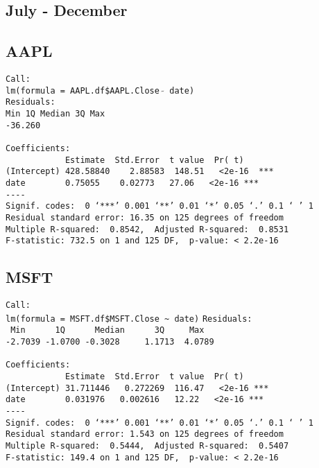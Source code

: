 \documentclass{article}[14pt]
\begin{document}
\subsection{July - December}
\subsection{AAPL}
\texttt{Call: \\
lm(formula = AAPL.df\$AAPL.Close $\tilde{}$ date)\\
Residuals:\\
Min \hspace{35pt} 1Q \qquad Median \qquad 3Q \qquad  Max\\
-36.260        \\}
\verb| |\\
\verb|Coefficients:|\\
\verb|            Estimate  Std.Error  t value  Pr( t)|\\
\verb|(Intercept) 428.58840    2.88583  148.51   <2e-16  ***|\\
\verb|date        0.75055    0.02773   27.06   <2e-16 ***|\\
\verb|----|\\
\verb|Signif. codes:  0 ‘***’ 0.001 ‘**’ 0.01 ‘*’ 0.05 ‘.’ 0.1 ‘ ’ 1|\\
\verb|Residual standard error: 16.35 on 125 degrees of freedom|\\
\verb|Multiple R-squared:  0.8542,	Adjusted R-squared:  0.8531|\\
\verb|F-statistic: 732.5 on 1 and 125 DF,  p-value: < 2.2e-16|
\subsection{MSFT}
\verb|Call:|\\
\verb|lm(formula = MSFT.df$MSFT.Close ~ date)|
\verb|Residuals:|\\
\verb| Min      1Q      Median      3Q     Max |\\
\verb|-2.7039 -1.0700 -0.3028     1.1713  4.0789|\\
\verb| |\\
\verb|Coefficients:|\\
\verb|            Estimate  Std.Error  t value  Pr( t)|\\
\verb|(Intercept) 31.711446   0.272269  116.47   <2e-16 ***|\\
\verb|date        0.031976   0.002616   12.22   <2e-16 ***|\\
\verb|----|\\
\verb|Signif. codes:  0 ‘***’ 0.001 ‘**’ 0.01 ‘*’ 0.05 ‘.’ 0.1 ‘ ’ 1|\\
\verb|Residual standard error: 1.543 on 125 degrees of freedom|\\
\verb|Multiple R-squared:  0.5444,	Adjusted R-squared:  0.5407|\\
\verb|F-statistic: 149.4 on 1 and 125 DF,  p-value: < 2.2e-16|
\end{document}
